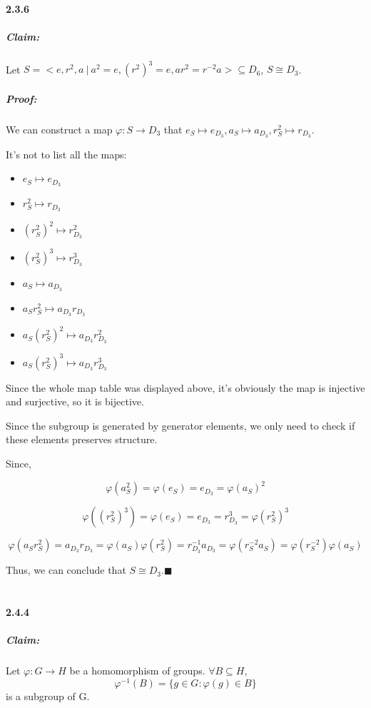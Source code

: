 \documentclass[11pt]{article}
\begin{document}
	\paragraph{2.3.6}
		\subparagraph{Claim:} Let $S = <e, r^2, a\ |\ a^2 = e, (r^2)^3 = e, ar^2 = r^{-2}a> \subseteq D_6$, $S \cong D_3$.
		\subparagraph{Proof:} We can construct a map $\varphi: S \rightarrow D_3$ that $e_S \mapsto e_{D_3}, a_S \mapsto a_{D_3}, r^2_{S} \mapsto r_{D_3}$.
		
		It's not to list all the maps:
		\begin{itemize}
			\item $e_S \mapsto e_{D_3}$
			\item $r^2_{S} \mapsto r_{D_3}$
			\item $(r^2_{S})^2 \mapsto r^2_{D_3}$
			\item $(r^2_{S})^3 \mapsto r^3_{D_3}$
			\item $a_S \mapsto a_{D_3}$
			\item $a_Sr^2_{S} \mapsto a_{D_3}r_{D_3}$
			\item $a_S(r^2_{S})^2 \mapsto a_{D_3}r^2_{D_3}$
			\item $a_S(r^2_{S})^3 \mapsto a_{D_3}r^3_{D_3}$
		\end{itemize} 
		
		Since the whole map table was displayed above, it's obviously the map is injective and surjective, so it is bijective.
		
		Since the subgroup is generated by generator elements, we only need to check if these elements preserves structure.
		
		Since,
				
		\[\varphi(a^2_S) = \varphi(e_S) = e_{D_3} = \varphi(a_S)^2\]
		
		\[\varphi((r_S^2)^3) = \varphi(e_S) = e_{D_3} = r^3_{D_3} = \varphi(r_S^2)^3\]
		
		\[\varphi(a_Sr_S^2) = a_{D_3}r_{D_3} = \varphi(a_S)\varphi(r^2_S) = r_{D_3}^{-1}a_{D_3} = \varphi(r^{-2}_Sa_S) = \varphi(r^{-2}_S)\varphi(a_S)\]
		
		Thus, we can conclude that $S \cong D_3$.$\blacksquare$\\\\
	\paragraph{2.4.4}
		\subparagraph{Claim:}
			Let $\varphi: G \rightarrow H$ be a homomorphism of groups. $\forall B \subseteq H$, \[\varphi^{-1}(B) = \{g \in G: \varphi(g) \in B\}\]
			is a subgroup of G.
			
\end{document}
